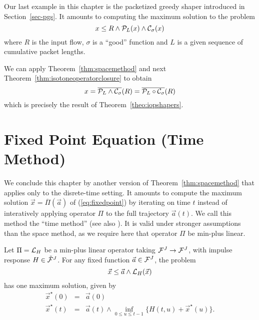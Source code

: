 Our last example in this chapter is the packetized greedy shaper
introduced in Section~\ref{sec-pgs}. It amounts to computing the
maximum solution to the problem
$$ x \leq R  \wedge \mathcal P_L(x) \wedge \mathcal C_{\sigma}(x) $$
where $R$ is the input flow,  $\sigma$ is a ``good'' function and $L$ is a given sequence of cumulative packet lengths.


We can apply Theorem~\ref{thm:spacemethod} and next Theorem~\ref{thm:isotoneoperatorclosure}
to obtain
$$ x = \overline{ \mathcal P_L \wedge \mathcal C_{\sigma} }(R) =  \overline{ \mathcal P_L \circ \mathcal C_{\sigma} }(R)$$
which is precisely the result of Theorem~\ref{theo:iopshapers}.

\section{Fixed Point Equation (Time Method)}

We conclude this chapter by another version of
Theorem~\ref{thm:spacemethod} that applies only to the
disrete-time setting. It amounts to compute the maximum solution
$\vec{x}=\overline{\Pi}(\vec{a})$ of (\ref{eq:fixedpoint}) by
iterating on time $t$ instead of interatively applying operator
$\Pi$ to the full trajectory $\vec{a}(t)$. We call this method the
``time method'' (see also \cite{Changbook}). It is valid under
stronger assumptions than the space method, as we require here
that operator $\Pi$ be min-plus linear.

\begin{theorem}
Let $\Pi = \mathcal L_H$ be a min-plus linear operator taking $\mathcal F^J \rightarrow \mathcal F^J$, with impulse response $H \in \tilde{\mathcal F}^J$.
For any fixed function $\vec{a} \in \mathcal F^{J}$, the problem
\begin{equation}
\mylabel{eq:fixedpointtime}
\vec{x} \leq \vec{a} \wedge \calL_H (\vec{x})
\end{equation}
has one maximum solution, given by
\begin{eqnarray*}
\vec{x}^{\star}(0) & = &  \vec{a}(0) \\
\vec{x}^{\star}(t) & = & \vec{a}(t)  \wedge \inf_{0 \leq u \leq t-1} \{ H(t,u) + \vec{x}^{\star}(u) \}.
\end{eqnarray*}
\end{theorem}

